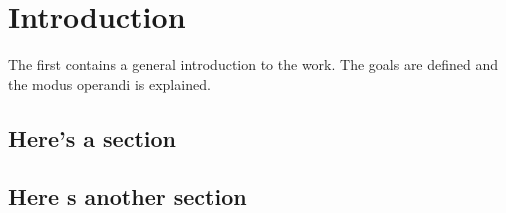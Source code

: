 \chapter{Introduction}
\label{cha:intro}
The first contains a general introduction to the work. The goals are
defined and the modus operandi is explained.

\section{Here's a section}


\section{Here s another section}


